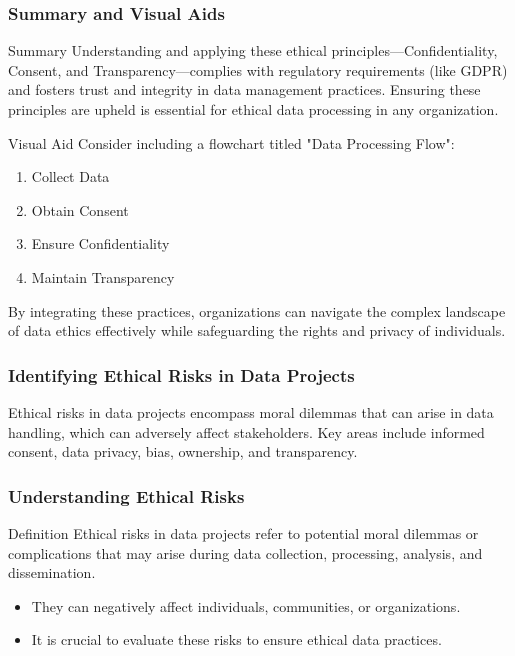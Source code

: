 \documentclass{beamer}
\begin{document}
\begin{frame}[fragile]
    \frametitle{Summary and Visual Aids}
    \begin{block}{Summary}
        Understanding and applying these ethical principles—Confidentiality, Consent, and Transparency—complies with regulatory requirements (like GDPR) and fosters trust and integrity in data management practices. Ensuring these principles are upheld is essential for ethical data processing in any organization.
    \end{block}
    
    \begin{block}{Visual Aid}
        Consider including a flowchart titled "Data Processing Flow":
        \begin{enumerate}
            \item Collect Data
            \item Obtain Consent
            \item Ensure Confidentiality
            \item Maintain Transparency
        \end{enumerate}
        By integrating these practices, organizations can navigate the complex landscape of data ethics effectively while safeguarding the rights and privacy of individuals.
    \end{block}
\end{frame}

\begin{frame}[fragile]
    \frametitle{Identifying Ethical Risks in Data Projects}
    Ethical risks in data projects encompass moral dilemmas that can arise in data handling, which can adversely affect stakeholders. Key areas include informed consent, data privacy, bias, ownership, and transparency.
\end{frame}

\begin{frame}[fragile]
    \frametitle{Understanding Ethical Risks}
    \begin{block}{Definition}
        Ethical risks in data projects refer to potential moral dilemmas or complications that may arise during data collection, processing, analysis, and dissemination.
    \end{block}

    \begin{itemize}
        \item They can negatively affect individuals, communities, or organizations.
        \item It is crucial to evaluate these risks to ensure ethical data practices.
    \end{itemize}
\end{frame}
\end{document}
